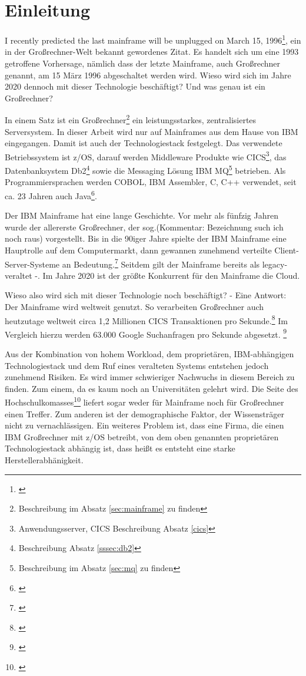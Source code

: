 \chapter{Einleitung}\label{ch:einleitung}
\glqq I recently predicted the last mainframe will be unplugged on March 15, 1996\grqq\footnote{\cite{Alsop.1993}}, ein in der Großrechner-Welt bekannt gewordenes Zitat.
Es handelt sich um eine 1993 getroffene Vorhersage, nämlich dass der letzte Mainframe, auch Großrechner genannt, am 15 März 1996 abgeschaltet werden wird.
Wieso wird sich im Jahre 2020 dennoch mit dieser Technologie beschäftigt? 
Und was genau ist ein Großrechner?

In einem Satz ist ein Großrechner\footnote{Beschreibung im Absatz \ref{sec:mainframe} zu finden} ein leistungsstarkes, zentralisiertes Serversystem.
In dieser Arbeit wird nur auf Mainframes aus dem Hause von IBM eingegangen.
Damit ist auch der Technologiestack festgelegt.
Das verwendete Betriebssystem ist z/OS, darauf werden Middleware Produkte wie CICS\footnote{Anwendungsserver, CICS Beschreibung Absatz \ref{cics}}, das Datenbanksystem Db2\footnote{ Beschreibung Absatz \ref{sssec:db2}} sowie die Messaging Lösung \glqq IBM MQ\grqq{}\footnote{Beschreibung im Absatz \ref{sec:mq} zu finden} betrieben.
Als Programmiersprachen werden COBOL, IBM Assembler, C, C++ verwendet, seit ca. 23 Jahren auch Java\footnote{\cite{Steegmans.2003}}.

Der IBM Mainframe hat eine lange Geschichte.
Vor mehr als fünfzig Jahren wurde der allererste Großrechner, der sog.(Kommentar: Bezeichnung such ich noch raus) vorgestellt.
Bis in die 90iger Jahre spielte der IBM Mainframe eine Hauptrolle auf dem Computermarkt, dann gewannen zunehmend verteilte Client-Server-Systeme an Bedeutung.\footnote{\cite{Ceruzzi.2003}}
Seitdem gilt der Mainframe bereits als \glqq  legacy\grqq{}- veraltet -.
Im Jahre 2020 ist der größte Konkurrent für den Mainframe die Cloud.

Wieso also wird sich mit dieser Technologie noch beschäftigt? - Eine Antwort: Der Mainframe wird weltweit genutzt.
So verarbeiten Großrechner auch heutzutage weltweit circa 1,2 Millionen CICS Transaktionen pro Sekunde.\footnote{\cite{IBM.2019}}
Im Vergleich hierzu werden 63.000 Google Suchanfragen pro Sekunde abgesetzt. \footnote{\cite{Sullivan.2016}}

Aus der Kombination von hohem Workload, dem proprietären, IBM-abhängigen Technologiestack und dem Ruf eines veralteten Systems entstehen jedoch zunehmend Risiken.
Es wird immer schwieriger Nachwuchs in diesem Bereich zu finden.
Zum einem,  da es kaum noch an Universitäten gelehrt wird.
Die Seite des Hochschulkomasses\footnote{\cite{internetagenturKolnFrankfurtsunzinetTYPO3Programmmierung.}} liefert sogar weder für \glqq Mainframe\grqq{} noch für \glqq Großrechner\grqq{} einen Treffer.
Zum anderen ist der demographische Faktor, der Wissensträger nicht zu vernachlässigen.
Ein weiteres Problem ist, dass eine Firma, die einen IBM Großrechner mit z/OS betreibt, von dem oben genannten proprietären Technologiestack abhängig ist, dass heißt es entsteht eine starke Herstellerabhänigkeit.

